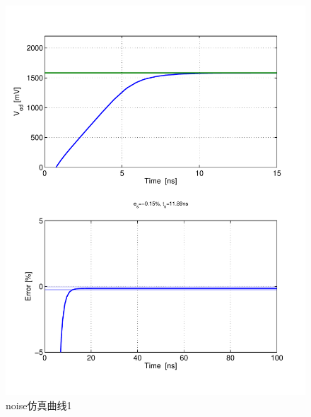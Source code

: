 \documentclass[a4paper]{article}
\begin{document}
\begin{figure}[htb]
    \begin{center}
        \includegraphics[width=\textwidth]{slow/tran1.pdf}
    \end{center}
    \caption{noise仿真曲线1}
    \label{slowtran1}
\end{figure}
\end{document}
